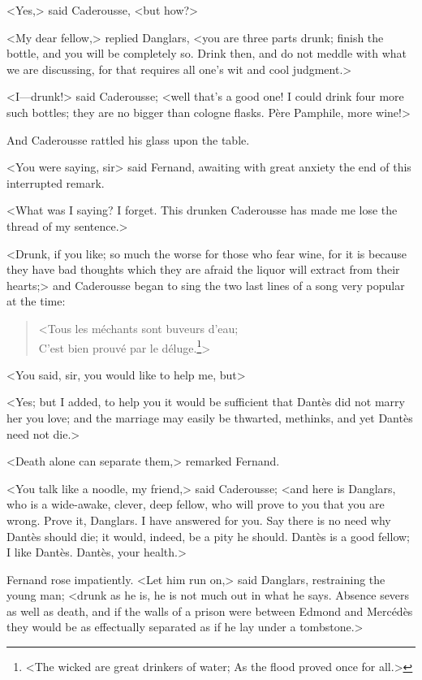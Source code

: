  <Yes,> said Caderousse, <but how?> 

 <My dear fellow,> replied Danglars, <you are three parts drunk; finish the bottle, and you will be completely so. Drink then, and do not meddle with what we are discussing, for that requires all one's wit and cool judgment.> 

 <I—drunk!> said Caderousse; <well that's a good one! I could drink four more such bottles; they are no bigger than cologne flasks. Père Pamphile, more wine!> 

 And Caderousse rattled his glass upon the table. 

 <You were saying, sir\longdash> said Fernand, awaiting with great anxiety the end of this interrupted remark. 

 <What was I saying? I forget. This drunken Caderousse has made me lose the thread of my sentence.> 

 <Drunk, if you like; so much the worse for those who fear wine, for it is because they have bad thoughts which they are afraid the liquor will extract from their hearts;> and Caderousse began to sing the two last lines of a song very popular at the time:  
 
 \begin{verse}
<Tous les méchants sont buveurs d'eau;\\ 
C'est bien prouvé par le déluge.\footnote{<The wicked are great drinkers of water; As the flood proved once for all.>}>
\end{verse}

 <You said, sir, you would like to help me, but\longdash> 

 <Yes; but I added, to help you it would be sufficient that Dantès did not marry her you love; and the marriage may easily be thwarted, methinks, and yet Dantès need not die.> 

 <Death alone can separate them,> remarked Fernand. 

 <You talk like a noodle, my friend,> said Caderousse; <and here is Danglars, who is a wide-awake, clever, deep fellow, who will prove to you that you are wrong. Prove it, Danglars. I have answered for you. Say there is no need why Dantès should die; it would, indeed, be a pity he should. Dantès is a good fellow; I like Dantès. Dantès, your health.> 

 Fernand rose impatiently. <Let him run on,> said Danglars, restraining the young man; <drunk as he is, he is not much out in what he says. Absence severs as well as death, and if the walls of a prison were between Edmond and Mercédès they would be as effectually separated as if he lay under a tombstone.>  
 
